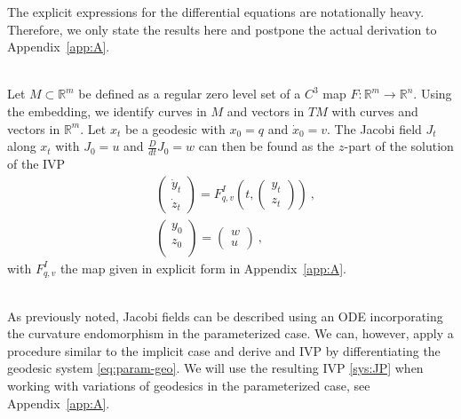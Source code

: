 \documentclass[final]{svjour3}
\newcommand{\RR}{\mathbb{R}}
\newcommand{\Df}[2]{\tfrac{D}{d#2} #1}
\begin{document}
The explicit expressions for the differential equations are notationally
heavy. Therefore, we only
state the results here and postpone the actual derivation 
to Appendix~\ref{app:A}.
\begin{em}
  \vspace{0.5em}
  \\
    Let $M\subset\RR^m$ be defined as a regular zero
    level set of a $C^3$ map $F:\RR^m\rightarrow\RR^n$. Using the embedding, we
    identify curves in $M$ and vectors in $TM$ with curves and vectors in
    $\RR^m$. Let $x_t$ be a geodesic with $x_0=q$ and $\dot{x}_0=v$.
    The Jacobi field $J_t$ along $x_t$ with $J_0=u$ and
    $\Df{J_0}{t}=w$ can then be found as the $z$-part of the solution of the IVP
    \begin{equation}
        \begin{split}
            &
            \begin{pmatrix}
                \dot{y}_t\\
                \dot{z}_t
            \end{pmatrix}
            =
            F_{q,v}^I\left(t,
            \begin{pmatrix}
                y_t\\
                z_t
            \end{pmatrix}
            \right)
            \ ,\\
            &
            \begin{pmatrix}
                y_0\\
                z_0\\
            \end{pmatrix}
            =
            \begin{pmatrix}
                w\\
                u
            \end{pmatrix}
            \ ,
        \end{split}
        \label{sys:JI}
    \end{equation}
    with $F_{q,v}^I$ the map given in explicit form in Appendix~\ref{app:A}.
\end{em}\vspace{0.5em}\\
As previously noted, Jacobi fields can be described using an ODE incorporating
the curvature endomorphism in the parameterized case. We can, however, apply a
procedure similar to the implicit case and derive and IVP by differentiating
the geodesic system \eqref{eq:param-geo}. We will use the resulting IVP
\eqref{sys:JP} when working
with variations of geodesics in the parameterized case, see
Appendix~\ref{app:A}.
\end{document}
